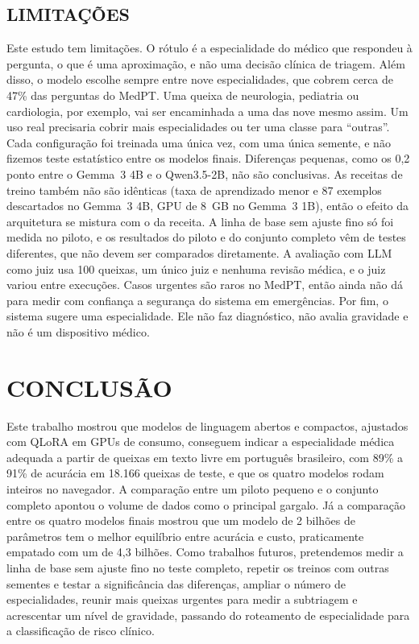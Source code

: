 \documentclass{ieeeaccess}
\begin{document}
\subsection{LIMITA\c{C}\~OES}
Este estudo tem limita\c{c}\~oes. O r\'otulo \'e a especialidade do m\'edico que respondeu \`a pergunta, o que \'e uma aproxima\c{c}\~ao, e n\~ao uma decis\~ao cl\'inica de triagem. Al\'em disso, o modelo escolhe sempre entre nove especialidades, que cobrem cerca de 47\% das perguntas do MedPT. Uma queixa de neurologia, pediatria ou cardiologia, por exemplo, vai ser encaminhada a uma das nove mesmo assim. Um uso real precisaria cobrir mais especialidades ou ter uma classe para ``outras''. Cada configura\c{c}\~ao foi treinada uma \'unica vez, com uma \'unica semente, e n\~ao fizemos teste estat\'istico entre os modelos finais. Diferen\c{c}as pequenas, como os 0,2 ponto entre o Gemma~3 4B e o Qwen3.5-2B, n\~ao s\~ao conclusivas. As receitas de treino tamb\'em n\~ao s\~ao id\^enticas (taxa de aprendizado menor e 87 exemplos descartados no Gemma~3 4B, GPU de 8~GB no Gemma~3 1B), ent\~ao o efeito da arquitetura se mistura com o da receita. A linha de base sem ajuste fino s\'o foi medida no piloto, e os resultados do piloto e do conjunto completo v\^em de testes diferentes, que n\~ao devem ser comparados diretamente. A avalia\c{c}\~ao com LLM como juiz usa 100 queixas, um \'unico juiz e nenhuma revis\~ao m\'edica, e o juiz variou entre execu\c{c}\~oes. Casos urgentes s\~ao raros no MedPT, ent\~ao ainda n\~ao d\'a para medir com confian\c{c}a a seguran\c{c}a do sistema em emerg\^encias. Por fim, o sistema sugere uma especialidade. Ele n\~ao faz diagn\'ostico, n\~ao avalia gravidade e n\~ao \'e um dispositivo m\'edico.

\section{CONCLUS\~AO}
\label{sec:conclusao}
Este trabalho mostrou que modelos de linguagem abertos e compactos, ajustados com QLoRA em GPUs de consumo, conseguem indicar a especialidade m\'edica adequada a partir de queixas em texto livre em portugu\^es brasileiro, com 89\% a 91\% de acur\'acia em 18.166 queixas de teste, e que os quatro modelos rodam inteiros no navegador. A compara\c{c}\~ao entre um piloto pequeno e o conjunto completo apontou o volume de dados como o principal gargalo. J\'a a compara\c{c}\~ao entre os quatro modelos finais mostrou que um modelo de 2 bilh\~oes de par\^ametros tem o melhor equil\'ibrio entre acur\'acia e custo, praticamente empatado com um de 4,3 bilh\~oes. Como trabalhos futuros, pretendemos medir a linha de base sem ajuste fino no teste completo, repetir os treinos com outras sementes e testar a signific\^ancia das diferen\c{c}as, ampliar o n\'umero de especialidades, reunir mais queixas urgentes para medir a subtriagem e acrescentar um n\'ivel de gravidade, passando do roteamento de especialidade para a classifica\c{c}\~ao de risco cl\'inico.
\end{document}
